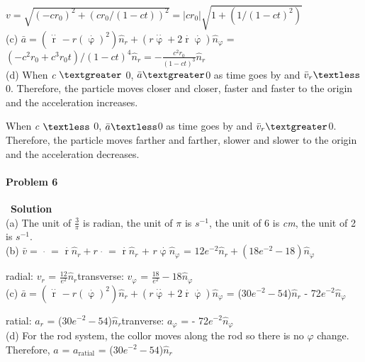 \documentclass[12pt,a4paper]{article}
\begin{document}
$v = \sqrt{(-cr_0)^2 + (cr_0/(1-ct))^2} = \lvert cr_0 \rvert \sqrt{1+(1/(1-ct)^2)}$\\
\noindent (c) $\bar{a} = (\mathop{r}\limits^{\cdot\cdot} - r(\mathop{\varphi}\limits^{\cdot})^2)\hat{n}_r + (r\mathop{\varphi}\limits^{\cdot\cdot}+2\mathop{r}\limits^{\cdot}\mathop{\varphi}\limits^{\cdot})\hat{n}_\varphi$ = $(-c^2r_0+c^3r_0t)/(1-ct)^4\hat{n}_r = -\frac{c^2r_0}{(1-ct)^3}\hat{n}_r$\\
\noindent (d) When \textit{c} $\textgreater$ 0, $\bar{a} \textgreater$0 as time goes by and $\bar{v}_r \textless$0. Therefore, the particle moves closer and closer, faster and faster to the origin and the acceleration increases.
\par When \textit{c} $\textless$ 0, $\bar{a} \textless$0 as time goes by and $\bar{v}_r \textgreater$0. Therefore, the particle moves farther and farther, slower and slower to the origin and the acceleration decreases.

\paragraph{\large \textbf{Problem 6}}~{\textbf{Solution}}
\vspace{2mm}\\
\noindent (a) The unit of $\frac{3}{\pi}$ is radian, the unit of $\pi$ is $s^{-1}$, the unit of 6 is \textit{cm}, the unit of 2 is $s^{-1}$.\\
\noindent (b) $\bar{v} = \mathop{\bar{r}}\limits^{\cdot}$ = $\mathop{r}\limits^{\cdot}\hat{n}_r + r\mathop{\hat{n}_r}\limits^{\cdot}$ = $\mathop{r}\limits^{\cdot}\hat{n}_r$ + $r\mathop{\varphi}\limits^{\cdot}\hat{n}_\varphi$ = $12e^{-2}\hat{n}_r + (18e^{-2}-18)\hat{n}_\varphi$
\par radial: $v_r$ = $\frac{12}{e^2} \hat{n}_r$\quad \quad transverse: $v_\varphi$ = $\frac{18}{e^2}-18 \hat{n}_\varphi$\\
\noindent (c) $\bar{a} = (\mathop{r}\limits^{\cdot\cdot} - r(\mathop{\varphi}\limits^{\cdot})^2)\hat{n}_r + (r\mathop{\varphi}\limits^{\cdot\cdot}+2\mathop{r}\limits^{\cdot}\mathop{\varphi}\limits^{\cdot})\hat{n}_\varphi$ = (30$e^{-2}-54$)$\hat{n}_r$ - 72$e^{-2}\hat{n}_\varphi$
\par ratial: $a_r$ = (30$e^{-2}-54$)$\hat{n}_r$\quad \quad tranverse: $a_\varphi$ = - 72$e^{-2}\hat{n}_\varphi$\\
\noindent (d) For the rod system, the collor moves along the rod so there is no $\varphi$ change. Therefore, $a$ = $a_{\text{ratial}}$ = (30$e^{-2}-54$)$\hat{n}_r$
\end{document}
